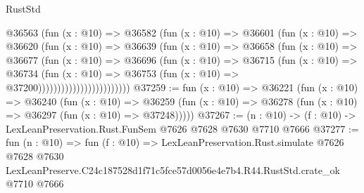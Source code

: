 \begin{lexlean}{RustStd}
\begin{coremodule}
                            @36563
                              (fun (x : @10) =>
                              @36582
                                (fun (x : @10) =>
                                @36601
                                  (fun (x : @10) =>
                                  @36620
                                    (fun (x : @10) =>
                                    @36639
                                      (fun (x : @10) =>
                                      @36658
                                        (fun (x : @10) =>
                                        @36677
                                          (fun (x : @10) =>
                                          @36696
                                            (fun (x : @10) =>
                                            @36715
                                              (fun (x : @10) =>
                                              @36734
                                                (fun (x : @10) =>
                                                @36753
                                                  (fun (x : @10) => @37200))))))))))))))))))))))))
@37259 := fun (x : @10) =>
  @36221
    (fun (x : @10) =>
    @36240
      (fun (x : @10) =>
      @36259 (fun (x : @10) => @36278 (fun (x : @10) => @36297 (fun (x : @10) => @37248)))))
@37267 := (n : @10) -> (f : @10) -> LexLeanPreservation.Rust.FunSem @7626 @7628 @7630 @7710 @7666
@37277 := fun (n : @10) =>
  fun (f : @10) =>
  LexLeanPreservation.Rust.simulate
    @7626
    @7628
    @7630
    LexLeanPreserve.C24c187528d1f71c5fce57d0056e4e7b4.R44.RustStd.crate_ok
    @7710
    @7666
\end{coremodule}
\end{lexlean}
